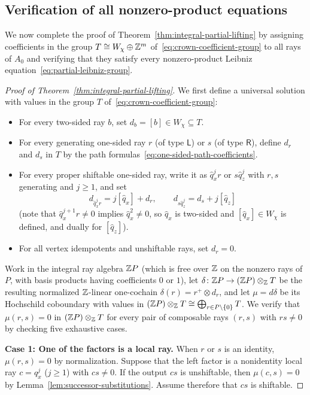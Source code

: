 \subsection{Verification of all nonzero-product equations}
\label{subsec:verify-nonzero-equations}

We now complete the proof of Theorem~\ref{thm:integral-partial-lifting} by assigning coefficients in the group $T\cong W_\chi\oplus\mathbb Z^m$ of~\eqref{eq:crown-coefficient-group} to all rays of $A_0$ and verifying that they satisfy every nonzero-product Leibniz equation~\eqref{eq:partial-leibniz-group}.

\begin{proof}[Proof of Theorem~\ref{thm:integral-partial-lifting}]
We first define a universal solution with values in the group $T$ of~\eqref{eq:crown-coefficient-group}:
\begin{itemize}
\item For every two-sided ray $b$, set $d_b=[b]\in W_\chi\subseteq T$.
\item For every generating one-sided ray $r$ (of type $\mathsf L$) or $s$ (of type $\mathsf R$), define $d_r$ and $d_s$ in $T$ by the path formulas~\eqref{eq:one-sided-path-coefficients}.
\item For every proper shiftable one-sided ray, write it as $\widehat q_x^jr$ or $s\widehat q_z^j$ with $r,s$ generating and $j\geq1$, and set
\begin{equation}
  d_{\widehat q_x^jr}=j[\widehat q_x]+d_r,\qquad
  d_{s\widehat q_z^j}=d_s+j[\widehat q_z]
  \label{eq:proper-successor-coefficients}
\end{equation}
(note that $\widehat q_x^{j+1}r\ne0$ implies $\widehat q_x^2\ne0$, so $\widehat q_x$ is two-sided and $[\widehat q_x]\in W_\chi$ is defined, and dually for $[\widehat q_z]$).
\item For all vertex idempotents and unshiftable rays, set $d_r=0$.
\end{itemize}
Work in the integral ray algebra $\mathbb Z P$ (which is free over $\mathbb Z$ on the nonzero rays of $P$, with basis products having coefficients $0$ or $1$), let $\delta\colon\mathbb Z P\to(\mathbb Z P)\otimes_\mathbb Z T$ be the resulting normalized $\mathbb Z$-linear one-cochain $\delta(r)=r^+\otimes d_r$, and let $\mu=d\delta$ be its Hochschild coboundary with values in $(\mathbb Z P)\otimes_\mathbb Z T\cong\bigoplus_{r\in P\setminus\{0\}}T$. We verify that $\mu(r,s)=0$ in $(\mathbb Z P)\otimes_\mathbb Z T$ for every pair of composable rays $(r,s)$ with $rs\ne0$ by checking five exhaustive cases.

\smallskip
\noindent\textbf{Case 1: One of the factors is a local ray.}
When $r$ or $s$ is an identity, $\mu(r,s)=0$ by normalization. Suppose that the left factor is a nonidentity local ray $c=q_x^j$ ($j\geq1$) with $cs\ne0$. If the output $cs$ is unshiftable, then $\mu(c,s)=0$ by Lemma~\ref{lem:successor-substitutions}. Assume therefore that $cs$ is shiftable.


\end{proof}
